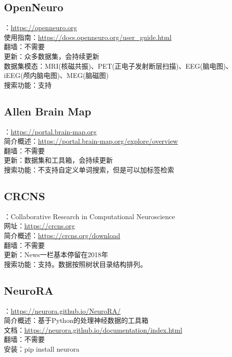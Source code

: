 \documentclass[12pt, a4paper, oneside]{ctexart}
\begin{document}
    \subsection{OpenNeuro}
    ：\url{https://openneuro.org}\\
    使用指南：\url{https://docs.openneuro.org/user_guide.html}\\
    翻墙：不需要\\
    更新：众多数据集，会持续更新\\
    数据集模态：MRI(核磁共振)、PET(正电子发射断层扫描)、EEG(脑电图)、iEEG(颅内脑电图)、MEG(脑磁图)\\
    搜索功能：支持

    \subsection{Allen Brain Map}
    ：\url{https://portal.brain-map.org}\\
    简介概述：\url{https://portal.brain-map.org/explore/overview}\\
    翻墙：不需要\\
    更新：数据集和工具箱，会持续更新\\
    搜索功能：不支持自定义单词搜索，但是可以加标签检索

    \subsection{CRCNS}
    ：Collaborative Research in Computational Neuroscience \\
    网址：\url{https://crcns.org}\\
    简介概述：\url{https://crcns.org/download}\\
    翻墙：不需要\\
    更新：News一栏基本停留在2018年\\
    搜索功能：支持。数据按照树状目录结构排列。

    \subsection{NeuroRA}
    ：\url{https://neurora.github.io/NeuroRA/}\\
    简介概述：基于Python的处理神经数据的工具箱\\
    文档：\url{https://neurora.github.io/documentation/index.html}\\
    翻墙：不需要\\
    安装：pip install neurora
\end{document}
